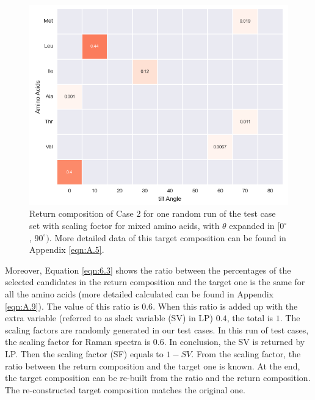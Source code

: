 \begin{figure}[!ht] 
\centering
\includegraphics[scale=0.7]{Figures/chapter6_figure_two.png}
\caption{Return composition of Case 2 for one random run of the test case set with scaling foctor for mixed amino acids, with $\theta$ expanded in $[0^{\circ}$, $90^{\circ})$. More detailed data of this target composition can be found in Appendix \ref{eqn:A.5}.} \label{fig:6.2}
\end{figure}


Moreover, Equation \ref{eqn:6.3} shows the ratio between the percentages of the selected candidates in the return composition and the target one is the same for all the amino acids (more detailed calculated can be found in Appendix \ref{eqn:A.9}). The value of this ratio is $0.6$. When this ratio is added up with the extra variable (referred to as slack variable (SV) in LP) $0.4$, the total is $1$. The scaling factors are randomly generated in our test cases. In this run of test cases, the scaling factor for Raman spectra is $0.6$. In conclusion, the SV is returned by LP. Then the scaling factor (SF) equals to $1 - SV$. From the scaling factor, the ratio between the return composition and the target one is known. At the end, the target composition can be re-built from the ratio and the return composition. The re-constructed target composition matches the original one. \\

